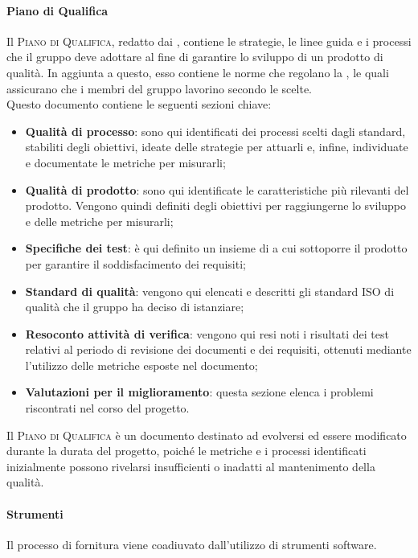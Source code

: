 \documentclass[../norme-di-progetto.tex]{subfiles}
\begin{document}
\paragraph{Piano di Qualifica}
Il \textsc{Piano di Qualifica}, redatto dai , contiene le strategie, le linee guida e i processi che il gruppo deve adottare al fine di garantire lo sviluppo di un prodotto di qualità. In aggiunta a questo, esso contiene le norme che regolano la , le quali assicurano che i membri del gruppo lavorino secondo le  scelte. \\
Questo documento contiene le seguenti sezioni chiave:
\begin{itemize}
  \item \textbf{Qualità di processo}: sono qui identificati dei processi scelti dagli standard, stabiliti degli obiettivi, ideate delle strategie per attuarli e, infine, individuate e documentate le metriche per misurarli;
  \item \textbf{Qualità di prodotto}: sono qui identificate le caratteristiche più rilevanti del prodotto. Vengono quindi definiti degli obiettivi per raggiungerne lo sviluppo e delle metriche per misurarli;
  \item \textbf{Specifiche dei test}: è qui definito un insieme di  a cui sottoporre il prodotto per garantire il soddisfacimento dei requisiti;
  \item \textbf{Standard di qualità}: vengono qui elencati e descritti gli standard ISO di qualità che il gruppo ha deciso di istanziare;
  \item \textbf{Resoconto attività di verifica}: vengono qui resi noti i risultati dei test relativi al periodo di revisione dei documenti e dei requisiti, ottenuti mediante l'utilizzo delle metriche esposte nel documento;
  \item \textbf{Valutazioni per il miglioramento}: questa sezione elenca i problemi riscontrati nel corso del progetto.
\end{itemize}

Il \textsc{Piano di Qualifica} è un documento destinato ad evolversi ed essere modificato durante la durata del progetto, poiché le metriche e i processi identificati inizialmente possono rivelarsi insufficienti o inadatti al mantenimento della qualità.
\paragraph{Strumenti}
Il processo di fornitura viene coadiuvato dall'utilizzo di strumenti software.
\end{document}

